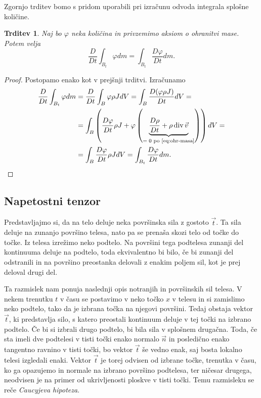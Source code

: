 \documentclass[12pt,a4paper,twoside]{article}
\theoremstyle{definition} %
\theoremstyle{plain} %
\newtheorem{trditev}[definicija]{Trditev}
\numberwithin{equation}{section}
\renewcommand{\div}{\operatorname{div}}
\renewcommand{\phi}{\varphi}
\newcommand{\DD}[2]{\ensuremath{\frac{D #1}{D #2}}}
\newcommand{\DDt}[1]{\DD{#1}{t}}
\newcommand{\vv}{\vec{v}}
\newcommand{\vt}{\vec{t}}
\newcommand{\vn}{\vec{n}}
\newcommand{\vx}{x}
\begin{document}
Zgornjo trditev bomo s pridom uporabili pri izračunu odvoda integrala splošne
količine.
\begin{trditev}
  \label{trd:swap-der-int}
  Naj bo $\phi$ neka količina in privzemimo aksiom o ohranitvi mase. Potem
  velja
  \begin{equation}
    \DDt{} \int_{B_t}\phi dm = \int_{B_t} \DDt{\phi} dm.
    \label{eq:swap-der-int}
  \end{equation}
\end{trditev}
\begin{proof}
Postopamo enako kot v prejšnji trditvi. Izračunamo
\begin{align*}
    \DDt{} \int_{B_t}\phi dm &=
    \DDt{} \int_{B}\phi \rho J dV =
    \int_{B} \DDt{(\phi \rho J)} dV  = \\ &=
  \int_{B} \left(\DDt{\phi} \rho J + \phi \left(\underbrace{\DDt{\rho} + \rho
  \div \vv}_{=\;0 \text{ po \eqref{eq:ohr-masa}}} \right) \right)dV  = \\ &=
  \int_{B} \DDt{\phi} \rho JdV =
  \int_{B_t} \DDt{\phi} dm. \qedhere
\end{align*}
\end{proof}

\subsection{Napetostni tenzor}
Predstavljajmo si, da na telo deluje neka površinska sila z gostoto $\vt$. Ta sila deluje
na zunanjo površino telesa, nato pa se prenaša skozi telo od točke do točke.
Iz telesa izrežimo neko podtelo. Na površini tega podtelesa zunanji del
kontinuuma deluje na podtelo, toda ekvivalentno bi bilo, če bi zunanji del odstranili in na površino
preostanka delovali z enakim poljem sil, kot je prej deloval drugi del.

Ta razmislek nam ponuja naslednji opis notranjih in površinskih sil telesa.  V nekem trenutku $t$ v
času se postavimo v neko točko $\vx$ v telesu in si zamislimo neko podtelo, tako da je izbrana točka
na njegovi površini. Tedaj obstaja vektor $\vt$, ki predstavlja silo, s katero preostali kontinuum
deluje v tej točki na izbrano podtelo. Če bi si izbrali drugo podtelo, bi bila sila v splošnem
drugačna. Toda, če sta imeli dve podtelesi v tisti točki enako normalo $\vn$ in posledično enako
tangentno ravnino v tisti točki, bo vektor $\vt$ še vedno enak, saj bosta lokalno telesi izgledali
enaki. Vektor $\vt$ je torej odvisen od izbrane točke, trenutka v času, ko ga opazujemo in normale
na izbrano površino podtelesa, ter ničesar drugega, neodvisen je na primer od ukrivljenosti ploskve
v tisti točki. Temu razmisleku se reče \emph{Caucyjeva hipoteza}.
\end{document}
